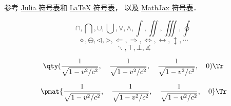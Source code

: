 
参考 \href{https://docs.julialang.org/en/v1/manual/unicode-input/}{Julia 符号表}和 \href{https://oeis.org/wiki/List_of_LaTeX_mathematical_symbols}{LaTeX 符号表}， 以及 \href{http://www.onemathematicalcat.org/MathJaxDocumentation/TeXSyntax.htm#U}{MathJax 符号表}．

\begin{equation}
\cap, \bigcap, \cup, \bigcup, \vee, \wedge, \int, \iint, \iiint, \oint
\end{equation}
\begin{equation}
\diamond, \ominus, \triangleleft, \triangleright, \Longleftarrow, \Longrightarrow, \iff, \leftrightarrow, \updownarrow, \cdots
\end{equation}
\begin{equation}
\ddots, \top, \bot, \measuredangle
\end{equation}

\begin{equation}
\qty(\frac{1}{\sqrt{1-v^2/c^2}}, \quad \frac{1}{\sqrt{1-v^2/c^2}}, \quad \frac{1}{\sqrt{1-v^2/c^2}}, \quad 0)\Tr
\end{equation}

\begin{equation}
\pmat{\frac{1}{\sqrt{1-v^2/c^2}}, \quad \frac{1}{\sqrt{1-v^2/c^2}}, \quad \frac{1}{\sqrt{1-v^2/c^2}}, \quad 0}\Tr
\end{equation}
